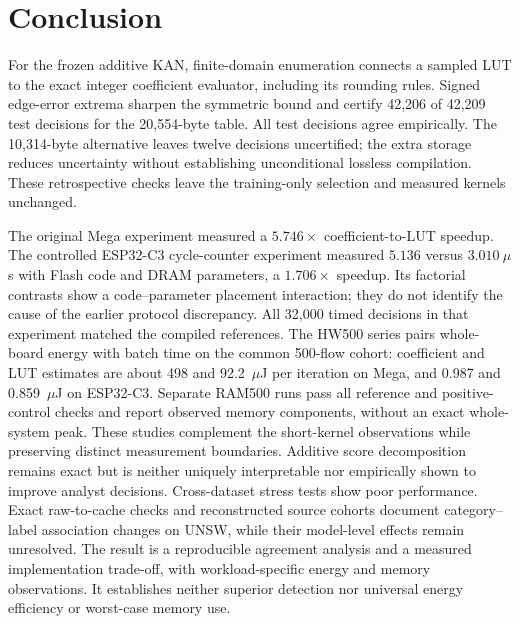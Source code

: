 \documentclass{ieeeaccess}
\begin{document}
\section{Conclusion}
For the frozen additive KAN, finite-domain enumeration connects a sampled LUT to the exact integer coefficient evaluator, including its rounding rules. Signed edge-error extrema sharpen the symmetric bound and certify 42,206 of 42,209 test decisions for the 20,554-byte table. All test decisions agree empirically. The 10,314-byte alternative leaves twelve decisions uncertified; the extra storage reduces uncertainty without establishing unconditional lossless compilation. These retrospective checks leave the training-only selection and measured kernels unchanged.

The original Mega experiment measured a $5.746\times$ coefficient-to-LUT speedup. The controlled ESP32-C3 cycle-counter experiment measured $5.136$ versus $3.010~\mu$s with Flash code and DRAM parameters, a $1.706\times$ speedup. Its factorial contrasts show a code--parameter placement interaction; they do not identify the cause of the earlier protocol discrepancy. All 32,000 timed decisions in that experiment matched the compiled references. The HW500 series pairs whole-board energy with batch time on the common 500-flow cohort: coefficient and LUT estimates are about 498 and 92.2~$\mu$J per iteration on Mega, and 0.987 and 0.859~$\mu$J on ESP32-C3. Separate RAM500 runs pass all reference and positive-control checks and report observed memory components, without an exact whole-system peak. These studies complement the short-kernel observations while preserving distinct measurement boundaries. Additive score decomposition remains exact but is neither uniquely interpretable nor empirically shown to improve analyst decisions. Cross-dataset stress tests show poor performance. Exact raw-to-cache checks and reconstructed source cohorts document category--label association changes on UNSW, while their model-level effects remain unresolved. The result is a reproducible agreement analysis and a measured implementation trade-off, with workload-specific energy and memory observations. It establishes neither superior detection nor universal energy efficiency or worst-case memory use.
\end{document}
